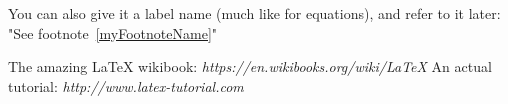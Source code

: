 \documentclass{article}
\begin{document}
You can also give it a label name (much like for equations), and refer to it later: "See footnote~\ref{myFootnoteName}"

\newpage

\begin{thebibliography}{1}
   The amazing \LaTeX \hspace{1pt} wikibook: {\em 
https://en.wikibooks.org/wiki/LaTeX}
   An actual tutorial: {\em http://www.latex-tutorial.com}
\end{thebibliography}
\end{document}
